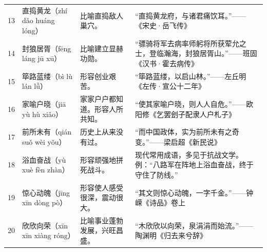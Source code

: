 \begin{table}[htbp]
\begin{tabularx}{\textwidth}{@{}c p{2.6cm} p{2.6cm} X@{}}
13 & 直捣黄龙（zhí dǎo huáng lóng） & 比喻直捣敌人巢穴。 & “直捣黄龙府，与诸君痛饮耳。”——《宋史·岳飞传》 \\
14 & 封狼居胥（fēng láng jū xū） & 比喻建立显赫功勋。 & “骠骑将军去病率师躬将所获荤允之士，登临瀚海，封狼居胥山。”——班固《汉书·霍去病传》 \\
15 & 筚路蓝缕（bì lù lán lǚ） & 形容创业艰苦。 & “筚路蓝缕，以启山林。”——左丘明《左传·宣公十二年》 \\
16 & 家喻户晓（jiā yù hù xiǎo） & 家家户户都知道。形容人所共知。 & “使其家喻户晓，则人人自危。”——欧阳修《乞罢刽子配隶人户札子》 \\
17 & 前所未有（qián suǒ wèi yǒu） & 历史上从来没有过。 & “而中国政体，实为前所未有之奇变。”——梁启超《新民说》 \\
18 & 浴血奋战（yù xuè fèn zhàn） & 形容顽强地拼死战斗。 & 现代常用成语，多见于抗战文学。例：“八路军在阵地上浴血奋战，终于守住了防线。” \\
19 & 惊心动魄（jīng xīn dòng pò） & 形容使人感受很深，震动很大。 & “其文则惊心动魄，一字千金。”——钟嵘《诗品》卷上 \\
20 & 欣欣向荣（xīn xīn xiàng róng） & 比喻事业蓬勃发展，兴旺昌盛。 & “木欣欣以向荣，泉涓涓而始流。”——陶渊明《归去来兮辞》 \\
\bottomrule
\end{tabularx}
\label{tab:excellent_words}
\end{table}